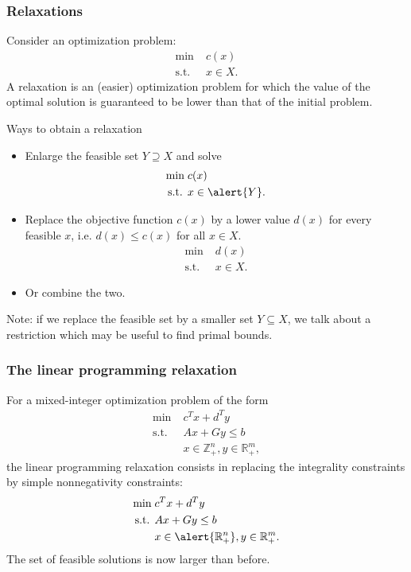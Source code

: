 \documentclass[9pt]{beamer}
\begin{document}
\begin{frame}
\frametitle{Relaxations}
Consider an optimization problem:
\begin{align*}
\min \; & c(x)\\
\text{s.t. } 
& x\in X.
\end{align*}
A \alert{relaxation} is an (easier) optimization problem for which the value of the optimal solution
is \alert{guaranteed to be lower} than that of the initial problem.
\begin{block}{Ways to obtain a relaxation}
\begin{itemize}
\item<1-> Enlarge the \alert{feasible set} $Y\supseteq X$ and solve
\begin{align*}
\min \; & c(x)\\
\text{s.t. } 
& x\in \alert{Y}.
\end{align*}
\item<1-> Replace the \alert{objective function} $c(x)$ by a \alert{lower value} $d(x)$ for every feasible $x$,
i.e. $d(x)\leq c(x) $ for all $x\in X.$
\begin{align*}
\min \; & d(x)\\
\text{s.t. } 
& x\in X.
\end{align*}
\item<1-> Or \alert{combine} the two.
\end{itemize}
Note: if we replace the feasible set by a  \alert{smaller set} $Y\subseteq X$, we talk about a \alert{restriction} which may be useful
to find \alert{primal bounds}.
\end{block}
\end{frame}
\begin{frame}
\frametitle{The linear programming relaxation}
For a mixed-integer optimization problem  of the form
\begin{align*}
\min \; & c^Tx+d^Ty\\
\text{s.t. } 
& Ax+Gy\leq b\\
&x\in \mathbb Z^n_+, y\in \mathbb R^m_+,
\end{align*}
the \alert{linear programming relaxation} consists in replacing the \alert{integrality constraints}
by simple \alert{nonnegativity constraints}:
\begin{align*}
\min \; & c^Tx+d^Ty\\
\text{s.t. } 
& Ax+Gy\leq b\\
&x\in \alert{\mathbb R^n_+}, y\in \mathbb R^m_+.
\end{align*}
The set of \alert{feasible solutions} is now larger than before.
\end{frame}
\end{document}
